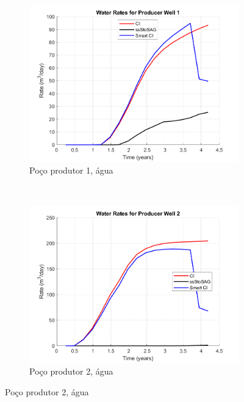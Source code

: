 \begin{figure}[!ht]
	\centering
	\begin{subfigure}[b]{.3\textwidth}
		\includegraphics[width=\textwidth]{figs/resultadosEgg/imgsim3/EGG_WaterWell1_Zoom}
		\caption{Po\c{c}o produtor 1, \'{a}gua}
		\label{EGG3_WaterWell1}
	\end{subfigure}
	~
	\begin{subfigure}[b]{.3\textwidth}
		\includegraphics[width=\textwidth]{figs/resultadosEgg/imgsim3/EGG_WaterWell2_Zoom}
		\caption{Po\c{c}o produtor 2, \'{a}gua}
		\label{EGG3_WaterWell2}
	\end{subfigure}
	

\end{figure}
